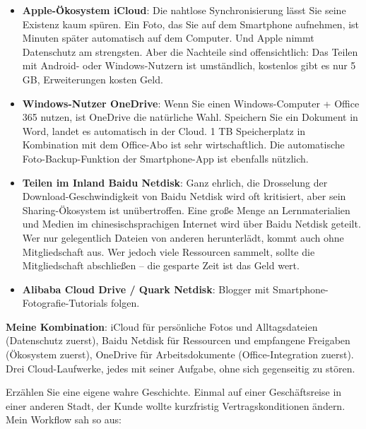 \begin{itemize}
  \item \textbf{Apple-Ökosystem iCloud}: Die nahtlose Synchronisierung lässt Sie seine Existenz kaum spüren. Ein Foto, das Sie auf dem Smartphone aufnehmen, ist Minuten später automatisch auf dem Computer. Und Apple nimmt Datenschutz am strengsten. Aber die Nachteile sind offensichtlich: Das Teilen mit Android- oder Windows-Nutzern ist umständlich, kostenlos gibt es nur 5 GB, Erweiterungen kosten Geld.
  \item \textbf{Windows-Nutzer OneDrive}: Wenn Sie einen Windows-Computer + Office 365 nutzen, ist OneDrive die natürliche Wahl. Speichern Sie ein Dokument in Word, landet es automatisch in der Cloud. 1 TB Speicherplatz in Kombination mit dem Office-Abo ist sehr wirtschaftlich. Die automatische Foto-Backup-Funktion der Smartphone-App ist ebenfalls nützlich.
  \item \textbf{Teilen im Inland Baidu Netdisk}: Ganz ehrlich, die Drosselung der Download-Geschwindigkeit von Baidu Netdisk wird oft kritisiert, aber sein Sharing-Ökosystem ist unübertroffen. Eine große Menge an Lernmaterialien und Medien im chinesischsprachigen Internet wird über Baidu Netdisk geteilt. Wer nur gelegentlich Dateien von anderen herunterlädt, kommt auch ohne Mitgliedschaft aus. Wer jedoch viele Ressourcen sammelt, sollte die Mitgliedschaft abschließen – die gesparte Zeit ist das Geld wert.
  \item \textbf{Alibaba Cloud Drive / Quark Netdisk}: Blogger mit Smartphone-Fotografie-Tutorials folgen.
\end{itemize}

\textbf{Meine Kombination}: iCloud für persönliche Fotos und Alltagsdateien (Datenschutz zuerst), Baidu Netdisk für Ressourcen und empfangene Freigaben (Ökosystem zuerst), OneDrive für Arbeitsdokumente (Office-Integration zuerst). Drei Cloud-Laufwerke, jedes mit seiner Aufgabe, ohne sich gegenseitig zu stören.


Erzählen Sie eine eigene wahre Geschichte. Einmal auf einer Geschäftsreise in einer anderen Stadt, der Kunde wollte kurzfristig Vertragskonditionen ändern. Mein Workflow sah so aus:

